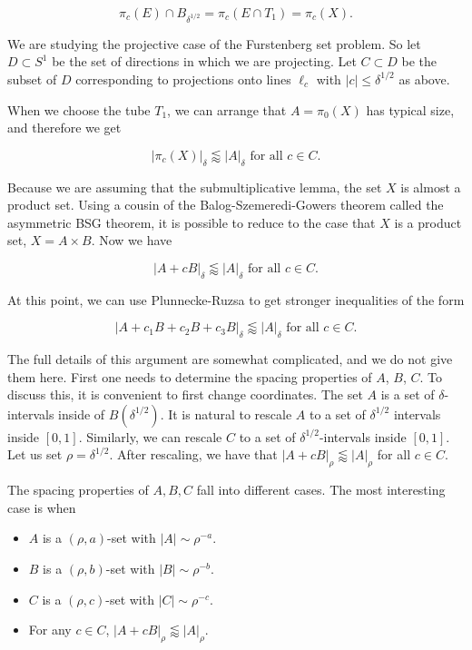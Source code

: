 \documentclass[12pt]{amsart}
\begin{document}
$$\pi_c(E) \cap B_{\delta^{1/2}} = \pi_c(E \cap T_1) = \pi_c(X).$$


We are studying the projective case of the Furstenberg set problem.   So let $D \subset S^1$ be the set of directions in which we are projecting.   Let $C \subset D$ be the subset of $D$ corresponding to projections onto lines $\ell_c$ with $|c| \le \delta^{1/2}$ as above. 

When we choose the tube $T_1$,  we can arrange that $A = \pi_0(X)$ has typical size,  and therefore we get

$$ | \pi_c(X) |_{\delta} \lessapprox |A|_\delta \textrm{ for all } c \in C. $$

Because we are assuming that the submultiplicative lemma,  the set $X$ is almost a product set.   Using a cousin of the Balog-Szemeredi-Gowers theorem called the asymmetric BSG theorem,  it is possible to reduce to the case that $X$ is a product set,  $X = A \times B$.   Now we have

$$ | A + c B|_\delta \lessapprox |A|_\delta \textrm{ for all } c \in C. $$

At this point,  we can use Plunnecke-Ruzsa to get stronger inequalities of the form

$$ |A + c_1 B + c_2 B + c_3 B|_\delta \lessapprox |A|_\delta  \textrm{ for all } c \in C. $$

The full details of this argument are somewhat complicated,  and we do not give them here.   First one needs to determine the spacing properties of $A$, $B$, $C$.   To discuss this,  it is convenient to first change coordinates.   The set $A$ is a set of $\delta$-intervals inside of $B(\delta^{1/2})$.   It is natural to rescale $A$ to a set of $\delta^{1/2}$ intervals inside $[0,1]$.   Similarly,  we can rescale $C$ to a set of $\delta^{1/2}$-intervals inside $[0,1]$.    Let us set $\rho = \delta^{1/2}$.   After rescaling,  we have that $|A+cB|_\rho \lessapprox |A|_\rho$ for all $c \in C$.   

The spacing properties of $A, B, C$ fall into different cases.   The most interesting case is when

\begin{itemize}
    \item $A$ is a $(\rho, a)$-set with $|A| \sim \rho^{-a}$.
    \item $B$ is a $(\rho, b)$-set with $|B| \sim \rho^{-b}$.
    \item $C$ is a $(\rho, c)$-set with $|C| \sim \rho^{-c}$.
    \item For any $c \in C$, $|A + cB|_\rho \lessapprox |A|_\rho$.
\end{itemize}
\end{document}
